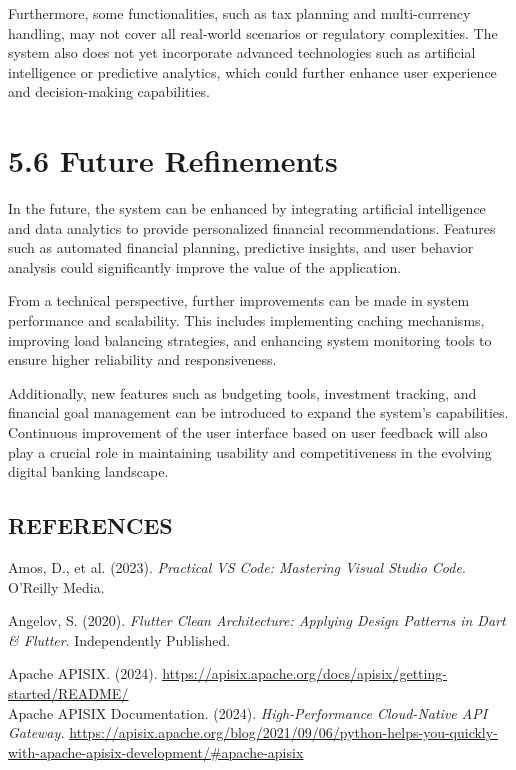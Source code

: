 Furthermore, some functionalities, such as tax planning and
multi-currency handling, may not cover all real-world scenarios or
regulatory complexities. The system also does not yet incorporate
advanced technologies such as artificial intelligence or predictive
analytics, which could further enhance user experience and
decision-making capabilities.

\section{\texorpdfstring{\textbf{5.6 Future
Refinements}}{5.6 Future Refinements}}\label{future-refinements}

In the future, the system can be enhanced by integrating artificial
intelligence and data analytics to provide personalized financial
recommendations. Features such as automated financial planning,
predictive insights, and user behavior analysis could significantly
improve the value of the application.

From a technical perspective, further improvements can be made in system
performance and scalability. This includes implementing caching
mechanisms, improving load balancing strategies, and enhancing system
monitoring tools to ensure higher reliability and responsiveness.

Additionally, new features such as budgeting tools, investment tracking,
and financial goal management can be introduced to expand the system's
capabilities. Continuous improvement of the user interface based on user
feedback will also play a crucial role in maintaining usability and
competitiveness in the evolving digital banking landscape.

\subsection{\texorpdfstring{\hfill\break
}{ }}\label{section-49}

\subsection{\texorpdfstring{\textbf{REFERENCES}}{REFERENCES}}\label{references}

Amos, D., et al. (2023). \emph{Practical VS Code: Mastering Visual
Studio Code}. O'Reilly Media.

Angelov, S. (2020). \emph{Flutter Clean Architecture: Applying Design
Patterns in Dart \& Flutter}. Independently Published.

Apache APISIX. (2024).
\href{https://apisix.apache.org/docs/apisix/getting-started/README/}{\ul{https://apisix.apache.org/docs/apisix/getting-started/README/}}\\
Apache APISIX Documentation. (2024). \emph{High-Performance Cloud-Native
API Gateway.}
\href{https://apisix.apache.org/blog/2021/09/06/python-helps-you-quickly-with-apache-apisix-development/\#apache-apisix}{\ul{https://apisix.apache.org/blog/2021/09/06/python-helps-you-quickly-with-apache-apisix-development/\#apache-apisix}}

